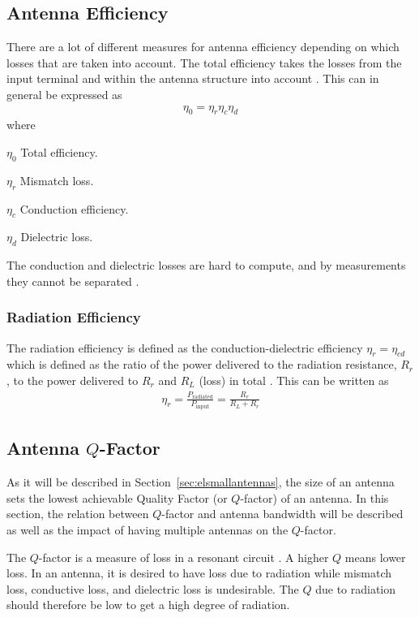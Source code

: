 \subsection{Antenna Efficiency}
There are a lot of different measures for antenna efficiency depending on which losses that are taken into account. The total efficiency takes the losses from the input terminal and within the antenna structure into account \cite{balanis2012antenna}. This can in general be expressed as \cite{balanis2012antenna}
\begin{align}%
\label{eq:ant-eff}
  \eta_0 = \eta_r \eta_c \eta_d 
\end{align}
where
\begin{where}
\item[$\eta_0$] Total efficiency.
\item[$\eta_r$] Mismatch loss.
\item[$\eta_c$] Conduction efficiency.
\item[$\eta_d$] Dielectric loss.
\end{where}
The conduction and dielectric losses are hard to compute, and by measurements they cannot be separated \cite{balanis2012antenna}.

\subsubsection{Radiation Efficiency}
The radiation efficiency is defined as the conduction-dielectric efficiency $\eta_r = \eta_{cd}$ which is defined as the ratio of the power delivered to the radiation resistance, $R_r$, to the power delivered to $R_r$ and $R_L$ (loss) in total \cite{balanis2012antenna}. This can be written as \cite{balanis2012antenna}
\begin{align} %
  \eta_r = \frac{P_{\text{radiated}}}{P_{\text{input}}} = \frac{R_r}{R_L+R_r}
\end{align}

\subsection{Antenna $Q$-Factor}
As it will be described in Section~\ref{sec:elsmallantennas}, the size of an antenna sets the lowest achievable Quality Factor (or $Q$-factor) of an antenna. In this section, the relation between $Q$-factor and antenna bandwidth will be described as well as the impact of having multiple antennas on the $Q$-factor.

The $Q$-factor is a measure of loss in a resonant circuit \cite{pozar2011microwave}. A higher $Q$ means lower loss. In an antenna, it is desired to have loss due to radiation while mismatch loss, conductive loss, and dielectric loss is undesirable. The $Q$ due to radiation should therefore be low to get a high degree of radiation.

